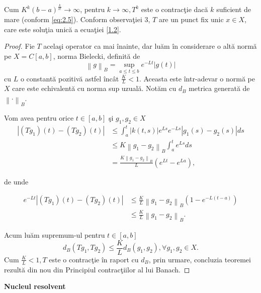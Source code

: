 \documentclass[a4paper,12pt,oneside]{report}
\begin{document}
\noindent Cum \(K^{k} \left ( b-a \right )^{\frac{k}{k!}}\rightarrow \infty\), pentru \(k\rightarrow \infty, T^{k}\) este o contrac\c{t}ie dac\u{a} \(k\) suficient de mare (conform \ref{eq:2.5}). Conform observa\c{t}iei 3, \(T\) are un punct fix unic \(x \in X\), care este solu\c{t}ia unic\u{a} a ecua\c{t}iei \ref{1.2}.

\begin{proof}

Fie \(T\) acela\c{s}i operator ca mai \^{i}nainte, dar lu\u{a}m \^{i}n considerare o alt\u{a} norm\u{a} pe \(X = C\left [ a,b \right ]\), norma Bielecki, definit\u{a} de
\begin{displaymath}
\left \| g \right \|_{B} = \sup_{a\leq t\leq b} e^{-Lt}\left | g\left ( t \right ) \right |
\end{displaymath}
cu \(L\) o constant\u{a} pozitiv\u{a} astfel \^{i}nc\^{a}t \(\frac{K}{L} < 1\). Aceasta este \^{i}ntr-adevar o norm\u{a} pe \(X\) care este echivalent\u{a} cu norma sup uzual\u{a}. Not\u{a}m cu \(d_{B}\) metrica generat\u{a} de \(\left \| \cdot \right \|_{B}\).

Vom avea pentru orice \(t\in \left [ a,b  \right ]\) \c{s}i \(g_{1}, g_{2} \in X\)
\begin{equation} \nonumber
    \begin{split}
     \left | \left ( Tg_{1} \right )\left ( t \right ) - \left ( Tg_{2} \right )\left ( t \right ) \right | &  \leq  \int_{a}^{t} \left | k\left ( t,s \right ) \right |e^{Ls}e^{-Ls}\left | g_{1}\left ( s \right ) - g_{2}\left ( s \right ) \right |ds \\&   \leq K\left \| g_{1} - g_{2} \right \|_{B} \int_{a}^{t}e^{Ls}ds  \\ & = \frac{K \left \| g_{1} - g_{2} \right \|_{B}}{L}\left ( e^{Lt} - e^{La}\right ),
    \end{split}
\end{equation}

\noindent de unde

\begin{equation} \nonumber
    \begin{split}
     e^{-Lt}\left | \left ( Tg_{1} \right ) \left ( t \right ) - \left ( Tg_{2} \right )\left ( t \right )\right | &    \leq \frac{K}{L}\left \| g_{1} - g_{2}\right \|_{B}\left ( 1 - e^{-L\left ( t-a \right )} \right ) \\ & \leq  \frac{K}{L}\left \| g_{1}  - g_{2}\right \|_{B}.
    \end{split}
\end{equation}

\noindent Acum lu\u{a}m supremum-ul pentru \(t \in \left [ a,b \right ]\)
\begin{displaymath}
d_{B}\left ( Tg_{1}, Tg_{2} \right ) \leq \frac{K}{L}d_{B}\left ( g_{1} , g_{2}\right ), \forall g_{1}, g_{2}\in X.
\end{displaymath}
Cum \(\frac{K}{L} < 1, T\) este o contrac\c{t}ie \^{i}n raport cu \(d_{B}\), prin urmare, concluzia teoremei rezult\u{a} din nou din Principiul contrac\c{t}iilor al lui Banach.
\end{proof}
\textbf{Nucleul resolvent}
\end{document}
